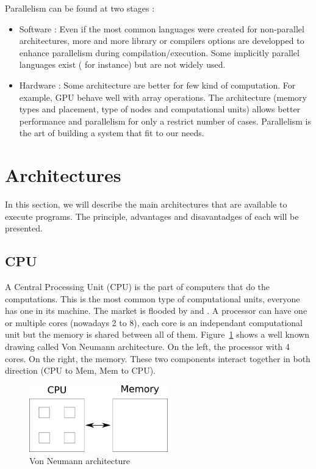 Parallelism can be found at two stages :
\begin{itemize}
\item Software : Even if the most common languages were created for non-parallel architectures, more and more library or compilers options are developped to enhance parallelism during compilation/execution. Some implicitly parallel languages exist ( for instance) but are not widely used.
\item Hardware : Some architecture are better for few kind of computation. For example, GPU behave well with array operations. The architecture (memory types and placement, type of nodes and computational units) allows better performance and parallelism  for only a restrict number of cases. Parallelism is the art of building a system that fit to our needs.
\end{itemize}

\section{Architectures}
In this section, we will describe the main architectures that are available to execute programs. The principle, advantages and disavantadges of each will be presented.

\subsection{CPU}
A Central Processing Unit (CPU) is the part of computers that do the computations. This is the most common type of computational units, everyone has one in its machine. The market is flooded  by  and . A processor can have one or multiple cores (nowadays 2 to 8), each core is an independant computational unit but the memory is shared between all of them. Figure~\ref{fig:VonNeumann} shows a well known drawing called Von Neumann architecture. On the left, the processor with 4 cores. On the right, the memory. These two components interact together in both direction (CPU to Mem, Mem to CPU).
\begin{figure}
\centering
\includegraphics[width=6cm]{gfx/Parallelism/VonNeumann.png}
\caption{Von Neumann architecture}
\label{fig:VonNeumann}
\end{figure}

